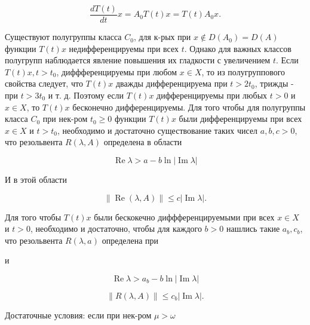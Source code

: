 \documentclass[10pt]{article}
\begin{document}
\[

\frac{d T(t)}{d t} x=A_{0} T(t) x=T(t) A_{0} x .

\]



Существуют полугруппы класса $C_{0}$, для к-рых при $x \notin D\left(A_{0}\right)=D(A)$ функции $T(t) x$ недифференцируемы при всех $t$. Однако для важных классов полугрупп наблюдается явление повышения их гладкости с увеличением $t$. Если $T(t) x, t>t_{0}$, диффференцируемы при любом $x \in X$, то из полугруппового свойства следует, что $T(t) x$ дважды дифференцируема при $t>2 t_{0}$, трижды - при $t>3 t_{0}$ и т. д. Поэтому если $T(t) x$ дифференцируемы при любых $t>0$ и $x \in X$, то $T(t) x$ бесконечно дифференцируемы. Для того чтобы для полугруппы класса $C_{0}$ при нек-ром $t_{0} \geqslant 0$ функции $T(t) x$ были дифференцируемы при всех $x \in X$ и $t>t_{0}$, необходимо и достаточно существование таких чисел $a, b, c>0$, что резольвента $R(\lambda, A)$ определена в области



\[

\operatorname{Re} \lambda>a-b \ln |\operatorname{Im} \lambda|

\]



И в этой области



\[

\|\operatorname{Re}(\lambda, A)\| \leqslant c|\operatorname{Im} \lambda| .

\]



Для того чтобы $T(t) x$ были бескокечно диффференцируемыми при всех $x \in X$ и $t>0$, необходимо и достаточно, чтобы для каждого $b>0$ нашлись такие $a_{b}, c_{b}$, что резольвента $R(\lambda, a)$ определена при



и



\[

\operatorname{Re} \lambda>a_{b}-b \ln |\operatorname{Im} \lambda|

\]



\[

\|R(\lambda, A)\| \leqslant c_{b}|\operatorname{Im} \lambda| .

\]



Достаточные условия: если при нек-ром $\mu>\omega$
\end{document}
